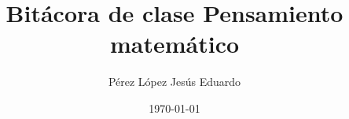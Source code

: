 \title{Bitácora de clase Pensamiento matemático}%
\author{Pérez López Jesús Eduardo}
\date{\today}
\maketitle
\thispagestyle{empty}  %